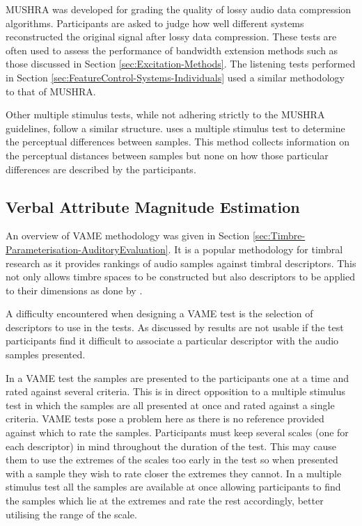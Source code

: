 		MUSHRA was developed for grading the quality of lossy audio data compression algorithms. Participants are
		asked to judge how well different systems reconstructed the original signal after lossy data compression.
		These tests are often used to assess the performance of bandwidth extension methods such as those discussed
		in Section \ref{sec:Excitation-Methods}. The listening tests performed in Section
		\ref{sec:FeatureControl-Systems-Individuals} used a similar methodology to that of MUSHRA.

		Other multiple stimulus tests, while not adhering strictly to the MUSHRA guidelines, follow a similar
		structure. \citet{arthi2015influence} uses a multiple stimulus test to determine the perceptual differences
		between samples. This method collects information on the perceptual distances between samples but none on
		how those particular differences are described by the participants.

	\subsection{Verbal Attribute Magnitude Estimation}
	\label{sec:ListeningTests-LaboratoryListeningTests-VAME}
		An overview of VAME methodology was given in Section \ref{sec:Timbre-Parameterisation-AuditoryEvaluation}.
		It is a popular methodology for timbral research as it provides rankings of audio samples against timbral
		descriptors. This not only allows timbre spaces to be constructed but also descriptors to be applied to
		their dimensions as done by \citet{zacharakis2014an}.

		A difficulty encountered when designing a VAME test is the selection of descriptors to use in the tests. As
		discussed by \citet{darke2005assessment} results are not usable if the test participants find it difficult
		to associate a particular descriptor with the audio samples presented.

		In a VAME test the samples are presented to the participants one at a time and rated against several
		criteria. This is in direct opposition to a multiple stimulus test in which the samples are all presented at
		once and rated against a single criteria. VAME tests pose a problem here as there is no reference provided
		against which to rate the samples. Participants must keep several scales (one for each descriptor) in mind
		throughout the duration of the test. This may cause them to use the extremes of the scales too early in the
		test so when presented with a sample they wish to rate closer the extremes they cannot. In a multiple
		stimulus test all the samples are available at once allowing participants to find the samples which lie at
		the extremes and rate the rest accordingly, better utilising the range of the scale.

